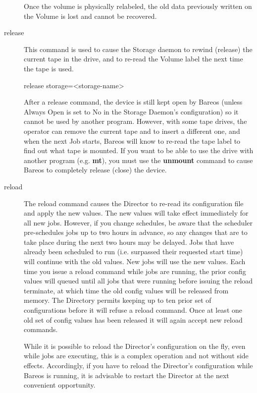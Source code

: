 \begin{description}
   Once the volume is physically relabeled, the old data previously written
   on the Volume is lost and cannot be recovered.

\item [release]
   This command is used to cause the Storage daemon to rewind (release) the
   current tape in the drive, and to re-read the Volume label the next time
   the tape is used.

release storage={\textless}storage-name{\textgreater}

   After a release command, the device is still kept open by Bareos (unless
   Always Open is set to No in the Storage Daemon's configuration) so it
   cannot be used by another program.  However, with some tape drives, the
   operator can remove the current tape and to insert a different one, and
   when the next Job starts, Bareos will know to re-read the tape label to
   find out what tape is mounted.  If you want to be able to use the drive
   with another program (e.g.  {\bf mt}), you must use the {\bf unmount}
   command to cause Bareos to completely release (close) the device.

\item [reload]
  The reload command causes the Director to re-read its configuration
  file and apply the new values. The new values will take effect
  immediately for all new jobs.  However, if you change schedules,
  be aware that the scheduler pre-schedules jobs up to two hours in
  advance, so any changes that are to take place during the next two
  hours may be delayed.  Jobs that have already been scheduled to run
  (i.e. surpassed their requested start time) will continue with the
  old values.  New jobs will use the new values. Each time you issue
  a reload command while jobs are running, the prior config values
  will queued until all jobs that were running before issuing
  the reload terminate, at which time the old config values will
  be released from memory. The Directory permits keeping up to
  ten prior set of configurations before it will refuse a reload
  command. Once at least one old set of config values has been
  released it will again accept new reload commands.

   While it is possible to reload the Director's configuration on the fly,
   even while jobs are executing, this is a complex operation and not
   without side effects.  Accordingly, if you have to reload the Director's
   configuration while Bareos is running, it is advisable to restart the
   Director at the next convenient opportunity.


\end{description}
